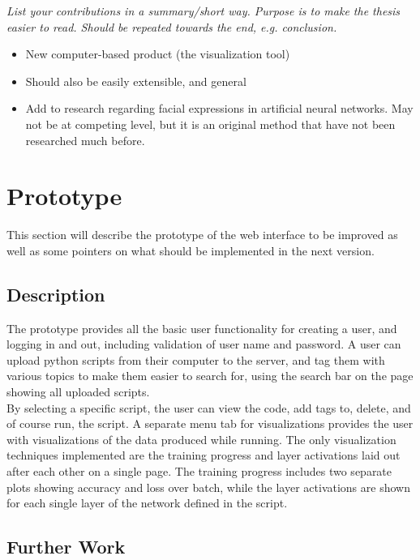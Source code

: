 \textit{List your contributions in a summary/short way. Purpose is to make the thesis easier to read. Should be repeated towards the end, e.g. conclusion.}

\begin{itemize}
    \item New computer-based product (the visualization tool)
    \item Should also be easily extensible, and general
    \item Add to research regarding facial expressions in artificial neural networks. May not be at competing level, but it is an original method that have not been researched much before.
\end{itemize}

\section{Prototype}

This section will describe the prototype of the web interface to be improved as well as some pointers on what should be implemented in the next version.

\subsection{Description}

\noindent The prototype provides all the basic user functionality for creating a user, and logging in and out, including validation of user name and password. A user can upload python scripts from their computer to the server, and tag them with various topics to make them easier to search for, using the search bar on the page showing all uploaded scripts. \\

\noindent By selecting a specific script, the user can view the code, add tags to, delete, and of course run, the script. A separate menu tab for visualizations provides the user with visualizations of the data produced while running. The only visualization techniques implemented are the training progress and layer activations laid out after each other on a single page. The training progress includes two separate plots showing accuracy and loss over batch, while the layer activations are shown for each single layer of the network defined in the script.

\subsection{Further Work}

